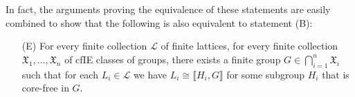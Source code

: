 \documentclass{gen-j-l}
\newcommand{\lb}{\ensuremath{\llbracket}}
\newcommand{\rb}{\ensuremath{\rrbracket}}
\newcommand{\<}{\ensuremath{\langle}}
\renewcommand{\>}{\ensuremath{\rangle}}
\theoremstyle{plain}
\theoremstyle{definition}
\theoremstyle{remark}
\numberwithin{theorem}{section}
\numberwithin{claim}{section}
\numberwithin{equation}{section}
\numberwithin{conjecture}{section}
\renewcommand{\leq}{\ensuremath{\leqslant}}
\newcommand{\2}{\ensuremath{\mathbf{2}}}
\newcommand{\3}{\ensuremath{\mathbf{3}}}
\newcommand{\sG}{\ensuremath{\mathfrak{X}}}
\newcommand{\sL}{\ensuremath{\mathscr{L}}}
\newcommand{\cP}{\ensuremath{\mathcal{P}}}
\newcommand{\IE}{{\small IE}}
\begin{document}
In fact, the arguments proving the equivalence of these
statements are easily combined to show that the following is also equivalent to
statement (B):
{\it 
\begin{enumerate}
\item[(E)]
For every finite collection $\sL$ of finite lattices, for every finite collection $\sG_1, \dots, \sG_n$
of \acs{cfIE} classes of groups,
there exists a finite group $G \in \bigcap\limits_{i=1}^n \sG_i$ such that for
each $L_i \in \sL$ we have $L_i\cong \lb H_i, G \rb$ for some subgroup
$H_i$ that is core-free in $G$. %
\end{enumerate}
}



\end{document}
